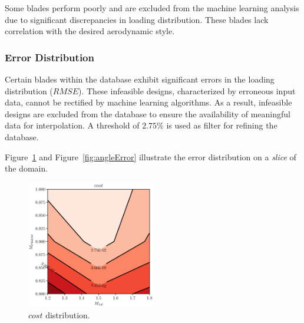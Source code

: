 \documentclass[11pt,a4paper,twocolumn]{article}
\begin{document}
Some blades perform poorly and are excluded from the machine learning analysis due to significant discrepancies in loading distribution. These blades lack correlation with the desired aerodynamic style.

\subsubsection{Error Distribution}


Certain blades within the database exhibit significant errors in the loading distribution ($RMSE$). These infeasible designs, characterized by erroneous input data, cannot be rectified by machine learning algorithms. As a result, infeasible designs are excluded from the database to ensure the availability of meaningful data for interpolation. A threshold of $2.75\%$ is used as filter for refining the database.

Figure~\ref{fig:errorDistribution1} and Figure~\ref{fig:angleError} illustrate the error distribution on a \textit{slice} of the domain.

\begin{figure}[!h]
    \centering
    \includegraphics[width=0.5\textwidth]{./images/costError1.eps}
    \caption{$cost$ distribution.}
    \label{fig:errorDistribution1}
\end{figure}
\end{document}

